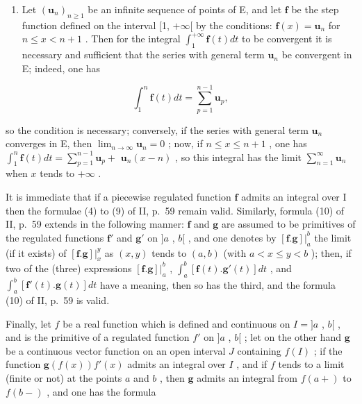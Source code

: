 \begin{enumerate}
\def\labelenumi{\arabic{enumi})}
\setcounter{enumi}{2}
\tightlist
\item
  Let \((\mathbf{u}_n)_{n\geqslant 1}\) be an infinite sequence of points of E, and let \(\mathbf{f}\) be the step function defined on the interval {[}1, \(+\infty[\) by the conditions: \(\mathbf{f}(x) = \mathbf{u}_n\) for \(n\leqslant x < n + 1\) . Then for the integral \(\int_1^{+\infty}\mathbf{f}(t)dt\) to be convergent it is necessary and sufficient that the series with general term \(\mathbf{u}_n\) be convergent in E; indeed, one has
\end{enumerate}

\[
\int_ {1} ^ {n} \mathbf {f} (t) d t = \sum_ {p = 1} ^ {n - 1} \mathbf {u} _ {p},
\]

so the condition is necessary; conversely, if the series with general term \(\mathbf{u}_n\) converges in E, then \(\lim_{n\to \infty}\mathbf{u}_n = 0\) ; now, if \(n\leqslant x\leqslant n + 1\) , one has \(\int_1^n\mathbf{f}(t)dt = \sum_{p = 1}^{n - 1}\mathbf{u}_p +\) \(\mathbf{u}_n(x - n)\) , so this integral has the limit \(\sum_{n = 1}^{\infty}\mathbf{u}_n\) when \(x\) tends to \(+\infty\) .

It is immediate that if a piecewise regulated function \(\mathbf{f}\) admits an integral over I then the formulae (4) to (9) of II, p.~59 remain valid. Similarly, formula (10) of II, p.~59 extends in the following manner: \(\mathbf{f}\) and \(\mathbf{g}\) are assumed to be primitives of the regulated functions \(\mathbf{f}'\) and \(\mathbf{g}'\) on \(]a\) , \(b[\) , and one denotes by \([\mathbf{f}.\mathbf{g}]|_a^b\) the limit (if it exists) of \([\mathbf{f}.\mathbf{g}]|_x^y\) as \((x, y)\) tends to \((a, b)\) (with \(a < x \leqslant y < b\) ); then, if two of the (three) expressions \([\mathbf{f}.\mathbf{g}]|_a^b\) , \(\int_a^b [\mathbf{f}(t).\mathbf{g}'(t)] dt\) , and \(\int_a^b [\mathbf{f}'(t).\mathbf{g}(t)] dt\) have a meaning, then so has the third, and the formula (10) of II, p.~59 is valid.

Finally, let \(f\) be a real function which is defined and continuous on \(I = ]a\) , \(b[\) , and is the primitive of a regulated function \(f'\) on \(]a\) , \(b[\) ; let on the other hand \(\mathbf{g}\) be a continuous vector function on an open interval \(J\) containing \(f(I)\) ; if the function \(\mathbf{g}(f(x))f'(x)\) admits an integral over \(I\) , and if \(f\) tends to a limit (finite or not) at the points \(a\) and \(b\) , then \(\mathbf{g}\) admits an integral from \(f(a+)\) to \(f(b-)\) , and one has the formula


